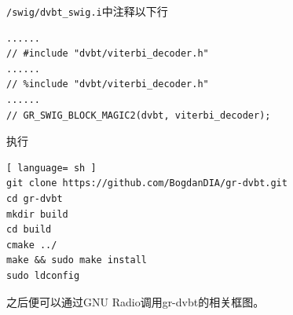 			\par \lstinline{/swig/dvbt_swig.i}中注释以下行
			\begin{lstlisting}
......
// #include "dvbt/viterbi_decoder.h"
......
// %include "dvbt/viterbi_decoder.h"
......
// GR_SWIG_BLOCK_MAGIC2(dvbt, viterbi_decoder);
			\end{lstlisting}
			\par 执行
			\begin{lstlisting}[ language= sh ]
git clone https://github.com/BogdanDIA/gr-dvbt.git
cd gr-dvbt
mkdir build
cd build
cmake ../
make && sudo make install
sudo ldconfig
			\end{lstlisting}
			\par 之后便可以通过GNU Radio调用gr-dvbt的相关框图。